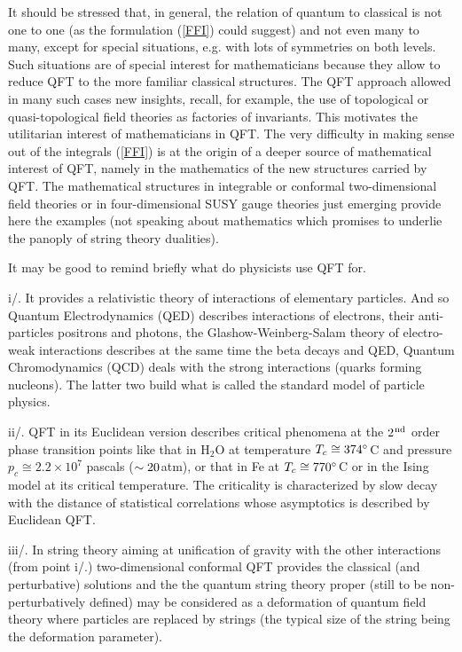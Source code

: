 It should be stressed that, in general, the relation of quantum
to classical is not one to one (as the formulation (\ref{FFI})
could suggest) and not even many to many, except for special
situations, e.g. with lots of symmetries
on both levels. Such situations are of special interest
for mathematicians because they allow to reduce QFT to
the more familiar classical structures. The QFT approach
allowed in many such cases new insights, recall, for example,
the use of topological or quasi-topological field theories as
factories of invariants. This motivates the utilitarian interest
of mathematicians in QFT. The very difficulty in making
sense out of the integrals (\ref{FFI}) is at the origin of a deeper
source of mathematical interest of QFT, namely in the mathematics
of the new structures carried by QFT. The mathematical structures
in integrable or conformal two-dimensional field theories or
in four-dimensional SUSY gauge theories just emerging provide here
the examples (not speaking about mathematics which promises to underlie
the panoply of string theory dualities).
\vskip 0.3cm

It may be good to remind briefly what do physicists use QFT for.

i/. It provides a relativistic theory of interactions of
elementary particles. And so Quantum Electrodynamics (QED)
describes interactions of electrons, their anti-particles
positrons and photons, the Glashow-Weinberg-Salam theory
of electro-weak interactions describes at the same time
the beta decays and QED, Quantum Chromodynamics (QCD) deals
with the strong interactions (quarks forming nucleons).
The latter two build what is called the standard model
of particle physics.

ii/. QFT in its Euclidean version describes critical phenomena
at the $2^{\hspace{0.025cm}\rm nd}$ order phase transition points like that
in H$_2$O at temperature $T_c\cong 374^\circ\hspace{0.025cm}$C and pressure
$p_c\cong2.2\times 10^7$ pascals ($\sim 20\hspace{0.025cm}$atm), or that
in Fe at $T_c\cong 770^\circ\hspace{0.025cm}$C or in the Ising model at its
critical temperature. The criticality is characterized by
slow decay with the distance of statistical correlations
whose asymptotics is described by Euclidean QFT.

iii/. In string theory aiming at unification of gravity
with the other interactions (from point i/.) two-dimensional
conformal QFT provides the classical (and perturbative)
solutions and the the quantum string theory proper
(still to be non-perturbatively defined) may be considered
as a deformation of quantum field theory where particles
are replaced by strings (the typical size of the string being
the deformation parameter).

